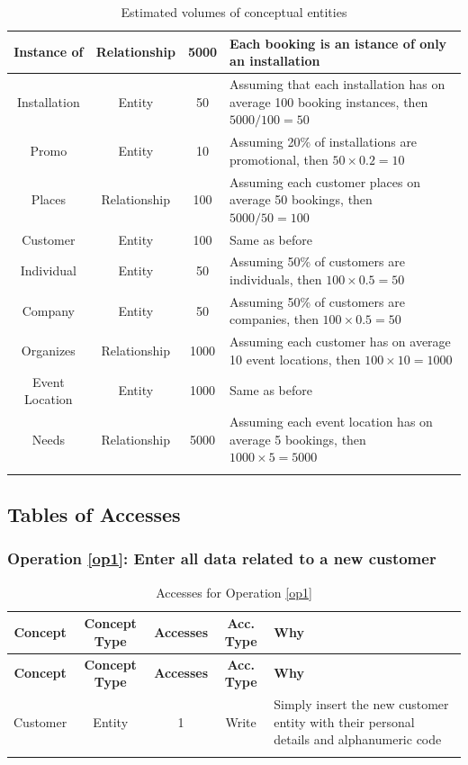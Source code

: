 \begin{longtable}{|c|c|c|p{8cm}|}
    \hline
    Instance of & Relationship & 5000 & Each booking is an istance of only an installation \\
    \hline
    Installation & Entity & 50 & Assuming that each installation has on average 100 booking instances, then $5000 / 100 = 50$ \\
    \hline
    Promo & Entity & 10 & Assuming 20\% of installations are promotional, then $50 \times 0.2 = 10$ \\
    \hline
    Places & Relationship & 100 & Assuming each customer places on average 50 bookings, then $5000 / 50 = 100$ \\
    \hline
    Customer & Entity & 100 & Same as before \\
    \hline
    Individual & Entity & 50 & Assuming 50\% of customers are individuals, then $100 \times 0.5 = 50$ \\
    \hline
    Company & Entity & 50 & Assuming 50\% of customers are companies, then $100 \times 0.5 = 50$ \\
    \hline
    Organizes & Relationship & 1000 & Assuming each customer has on average 10 event locations, then $100 \times 10 = 1000$ \\
    \hline
    Event Location & Entity & 1000 & Same as before \\
    \hline
    Needs & Relationship & 5000 & Assuming each event location has on average 5 bookings, then $1000 \times 5 = 5000$ \\
    \hline
    \caption{Estimated volumes of conceptual entities}
    \label{tab:volumes-logical}
\end{longtable}

\subsection{Tables of Accesses}

\subsubsection{Operation \ref{op1}: Enter all data related to a new customer}

\begin{longtable}[H]{|c|c|c|c|p{7cm}|}
    \hline
    \textbf{Concept} & \textbf{Concept Type} & \textbf{Accesses} & \textbf{Acc. Type} & \textbf{Why} \\
    \hline
    \endfirsthead
    \hline
    \textbf{Concept} & \textbf{Concept Type} & \textbf{Accesses} & \textbf{Acc. Type} & \textbf{Why} \\
    \hline
    \endhead
    Customer & Entity & 1 & Write & Simply insert the new customer entity with their personal details and alphanumeric code \\
    \hline
    \caption{Accesses for Operation \ref{op1}}
    \label{tab:op1-accesses-logical}
\end{longtable}

